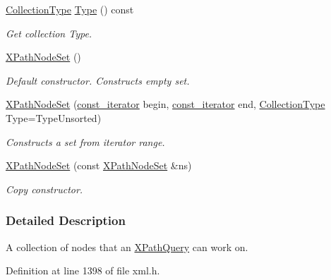 \begin{DoxyCompactItemize}
\hyperlink{classphys_1_1xml_1_1XPathNodeSet_ab178d39e119369702541033c067a995c}{CollectionType} \hyperlink{classphys_1_1xml_1_1XPathNodeSet_a95c90708290e045ef04425a71b2ddf25}{Type} () const 
\begin{DoxyCompactList}\small\item\em Get collection Type. \item\end{DoxyCompactList}\item 
\hypertarget{classphys_1_1xml_1_1XPathNodeSet_a24b0e325cd45548e3f63bd37557eab93}{
\hyperlink{classphys_1_1xml_1_1XPathNodeSet_a24b0e325cd45548e3f63bd37557eab93}{XPathNodeSet} ()}
\label{classphys_1_1xml_1_1XPathNodeSet_a24b0e325cd45548e3f63bd37557eab93}

\begin{DoxyCompactList}\small\item\em Default constructor. Constructs empty set. \item\end{DoxyCompactList}\item 
\hyperlink{classphys_1_1xml_1_1XPathNodeSet_a4184ec067744749dd044f7740d2dc6e3}{XPathNodeSet} (\hyperlink{classphys_1_1xml_1_1XPathNode}{const\_\-iterator} begin, \hyperlink{classphys_1_1xml_1_1XPathNode}{const\_\-iterator} end, \hyperlink{classphys_1_1xml_1_1XPathNodeSet_ab178d39e119369702541033c067a995c}{CollectionType} Type=TypeUnsorted)
\begin{DoxyCompactList}\small\item\em Constructs a set from iterator range. \item\end{DoxyCompactList}\item 
\hyperlink{classphys_1_1xml_1_1XPathNodeSet_af4ac7af973425828bd66dc278887695c}{XPathNodeSet} (const \hyperlink{classphys_1_1xml_1_1XPathNodeSet}{XPathNodeSet} \&ns)
\begin{DoxyCompactList}\small\item\em Copy constructor. \item\end{DoxyCompactList}\end{DoxyCompactItemize}


\subsubsection{Detailed Description}
A collection of nodes that an \hyperlink{classphys_1_1xml_1_1XPathQuery}{XPathQuery} can work on. 

Definition at line 1398 of file xml.h.



